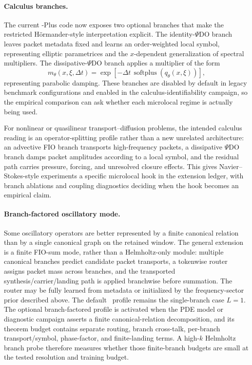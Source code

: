 \paragraph{Calculus branches.}
The current \MiNO-Plus code now exposes two optional branches that make the restricted H\"ormander-style interpretation explicit.  The identity-$\Psi$DO branch leaves packet metadata fixed and learns an order-weighted local symbol, representing elliptic parametrices and the $x$-dependent generalization of spectral multipliers.  The dissipative-$\Psi$DO branch applies a multiplier of the form
\[
m_\theta(x,\xi,\Delta t)=\exp[-\Delta t\,\operatorname{softplus}(q_\theta(x,\xi))],
\]
representing parabolic damping.  These branches are disabled by default in legacy benchmark configurations and enabled in the calculus-identifiability campaign, so the empirical comparison can ask whether each microlocal regime is actually being used.

For nonlinear or quasilinear transport--diffusion problems, the intended calculus reading is an operator-splitting profile rather than a new unrelated architecture: an advective FIO branch transports high-frequency packets, a dissipative $\Psi$DO branch damps packet amplitudes according to a local symbol, and the residual path carries pressure, forcing, and unresolved closure effects.  This gives Navier--Stokes-style experiments a specific microlocal hook in the extension ledger, with branch ablations and coupling diagnostics deciding when the hook becomes an empirical claim.

\paragraph{Branch-factored oscillatory mode.}
Some oscillatory operators are better represented by a finite canonical relation than by a single canonical graph on the retained window.  The general extension is a finite FIO-sum mode, rather than a Helmholtz-only module: multiple canonical branches predict candidate packet transports, a tokenwise router assigns packet mass across branches, and the transported synthesis/carrier/landing path is applied branchwise before summation.  The router may be fully learned from metadata or initialized by the frequency-sector prior described above.  The default \MiNO\ profile remains the single-branch case $L=1$.  The optional branch-factored profile is activated when the PDE model or diagnostic campaign asserts a finite canonical-relation decomposition, and its theorem budget contains separate routing, branch cross-talk, per-branch transport/symbol, phase-factor, and finite-landing terms.  A high-$k$ Helmholtz branch probe therefore measures whether those finite-branch budgets are small at the tested resolution and training budget.

